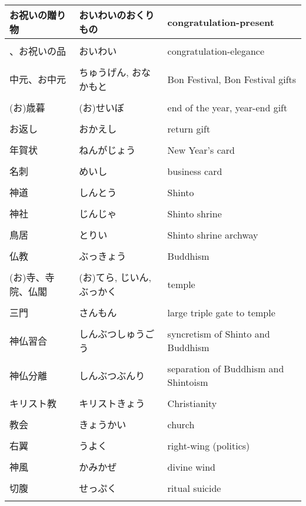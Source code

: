 \documentclass{article}
\begin{document}
\begin{tabular}{ l | l | p{7.5cm} }
お祝いの贈り物 & おいわいのおくりもの & congratulation-present\\ \hline \\[-1em]
、お祝いの品 & おいわい & congratulation-elegance\\ \hline \\[-1em]
中元、お中元 & ちゅうげん, おなかもと & Bon Festival, Bon Festival gifts\\ \hline \\[-1em]
(お)歳暮 & (お)せいぼ & end of the year, year-end gift\\ \hline \\[-1em]
お返し & おかえし & return gift\\ \hline \\[-1em]
年賀状 & ねんがじょう & New Year's card\\ \hline \\[-1em]
名刺	& めいし & business card \\ \hline \\[-1em]
神道 & しんとう & Shinto\\ \hline \\[-1em]
神社 & じんじゃ & Shinto shrine\\ \hline \\[-1em]
鳥居 & とりい & Shinto shrine archway\\ \hline \\[-1em]
仏教 & ぶっきょう & Buddhism\\ \hline \\[-1em]
(お)寺、寺院、仏閣	& (お)てら, じいん, ぶっかく & temple\\ \hline \\[-1em]
三門	& さんもん & large triple gate to temple\\ \hline \\[-1em]
神仏習合	& しんぶつしゅうごう & syncretism of Shinto and Buddhism\\ \hline \\[-1em]
神仏分離	& しんぶつぶんり & separation of Buddhism and Shintoism\\ \hline \\[-1em]
キリスト教 & キリストきょう & Christianity\\ \hline \\[-1em]
教会 & きょうかい & church\\ \hline \\[-1em]
右翼	& うよく & right-wing (politics)\\ \hline \\[-1em]
神風	& かみかぜ & divine wind\\ \hline \\[-1em]
切腹 & せっぷく & ritual suicide\\ \hline \\[-1em]
\end{tabular}
\end{document}
